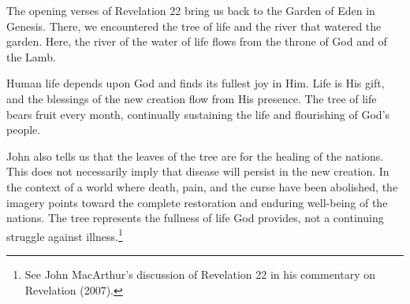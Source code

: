 The opening verses of Revelation 22 bring us back to the Garden of Eden in Genesis. There, we encountered the tree of life and the river that watered the garden. Here, the river of the water of life flows from the throne of God and of the Lamb.

Human life depends upon God and finds its fullest joy in Him. Life is His gift, and the blessings of the new creation flow from His presence. The tree of life bears fruit every month, continually sustaining the life and flourishing of God's people.

John also tells us that the leaves of the tree are for the healing of the nations. This does not necessarily imply that disease will persist in the new creation. In the context of a world where death, pain, and the curse have been abolished, the imagery points toward the complete restoration and enduring well-being of the nations. The tree represents the fullness of life God provides, not a continuing struggle against illness.\footnote{See John MacArthur's discussion of Revelation 22 in his commentary on Revelation (2007).}

